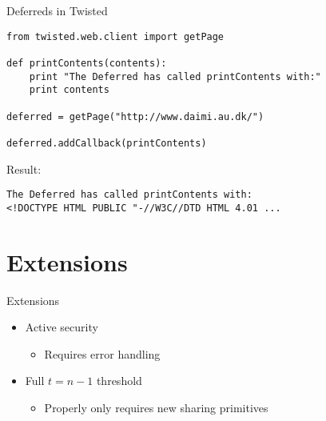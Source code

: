 \documentclass[t,noamsthm]{beamer}
\begin{document}
\begin{frame}[fragile]{Deferreds in Twisted}%

\begin{lstlisting}
from twisted.web.client import getPage

def printContents(contents):
    print "The Deferred has called printContents with:"
    print contents

deferred = getPage("http://www.daimi.au.dk/")

deferred.addCallback(printContents)
\end{lstlisting}

Result:
\begin{lstlisting}[language={}]
The Deferred has called printContents with:
<!DOCTYPE HTML PUBLIC "-//W3C//DTD HTML 4.01 ...
\end{lstlisting}

\end{frame}


\section{Extensions}

\begin{frame}{Extensions}

  \begin{itemize}

  \item Active security
    \begin{itemize}
    \item Requires error handling
    \end{itemize}

  \item Full $t = n-1$ threshold
    \begin{itemize}
    \item Properly only requires new sharing primitives
    \end{itemize}

  \end{itemize}

\end{frame}
\end{document}
